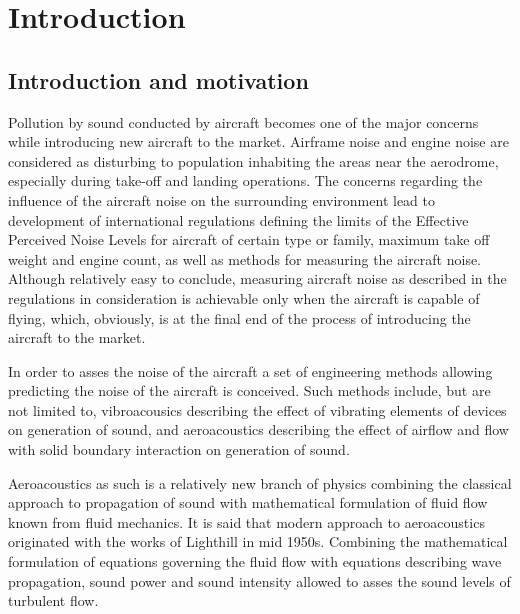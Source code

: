 
\chapter{Introduction} %

\label{introduction} %


\section{Introduction and motivation}

Pollution by sound conducted by aircraft becomes one of the major concerns while introducing new aircraft to the market. Airframe noise and engine noise are considered as disturbing to population inhabiting the areas near the aerodrome, especially during take-off and landing operations. The concerns regarding the influence of the aircraft noise on the surrounding environment lead to development of international regulations defining the limits of the Effective Perceived Noise Levels for aircraft of certain type or family, maximum take off weight and engine count, as well as methods for measuring the aircraft noise. Although relatively easy to conclude, measuring aircraft noise as described in the regulations in consideration is achievable only when the aircraft is capable of flying, which, obviously, is at the final end of the process of introducing the aircraft to the market.

In order to asses the noise of the aircraft a set of engineering methods allowing predicting the noise of the aircraft is conceived. Such methods include, but are not limited to, vibroacousics describing the effect of vibrating elements of devices on generation of sound, and  aeroacoustics describing the effect of airflow and flow with solid boundary interaction on generation of sound.

Aeroacoustics as such is a relatively new branch of physics combining the classical approach to propagation of sound with mathematical formulation of fluid flow known from fluid mechanics. It is said that modern approach to aeroacoustics originated with the works of Lighthill \citep{Light1} \citep{Light2} in mid 1950s. Combining the mathematical formulation of equations governing the fluid flow with equations describing wave propagation, sound power and sound intensity allowed to asses the sound levels of turbulent flow.

